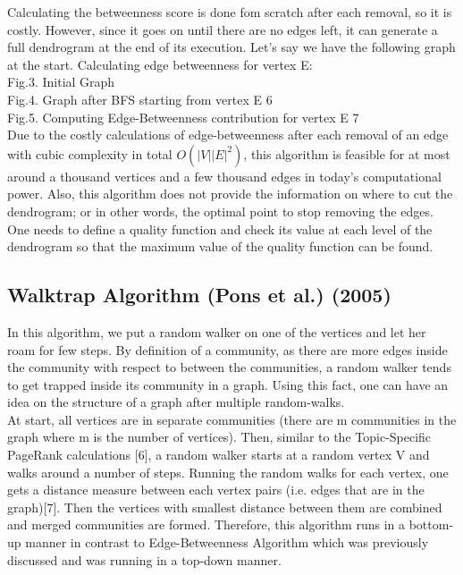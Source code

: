 \documentclass[10pt]{article}
\begin{document}
Calculating the betweenness score is done fom scratch after each removal, so it is costly. However, since it goes on until there are no edges left, it can generate a full dendrogram at the end of its execution. Let’s say we have the following graph at the start. Calculating edge betweenness for vertex E: \\

Fig.3. Initial Graph \\

Fig.4. Graph after BFS starting from vertex E 6 \\
  
Fig.5. Computing Edge-Betweenness contribution for vertex E 7 \\

Due to the costly calculations of edge-betweenness after each removal of an edge with cubic complexity in total $O\left(|V||E|^2 \right)$, this algorithm is feasible for at most around a thousand vertices and a few thousand edges in today’s computational power. Also, this algorithm does not provide the information on where to cut the dendrogram; or in other words, the optimal point to stop removing the edges. One needs to define a quality function and check its value at each level of the dendrogram so that the maximum value of the quality function can be found. \\

\subsection{Walktrap Algorithm (Pons et al.) (2005)} 

In this algorithm, we put a random walker on one of the vertices and let her roam for few steps. By definition of a community, as there are more edges inside the community with respect to between the communities, a random walker tends to get trapped inside its community in a graph. Using this fact, one can have an idea on the structure of a graph after multiple random-walks. \\

At start, all vertices are in separate communities (there are m communities in the graph where m is the number of vertices). Then, similar to the Topic-Specific PageRank calculations [6], a random walker starts at a random vertex V and walks around a number of steps. Running the random walks for each vertex, one gets a distance measure between each vertex pairs (i.e. edges that are in the graph)[7]. Then the vertices with smallest distance between them are combined and merged communities are formed. Therefore, this algorithm runs in a bottom-up manner in contrast to Edge-Betweenness Algorithm which was previously discussed and was running in a top-down manner. \\
\end{document}

